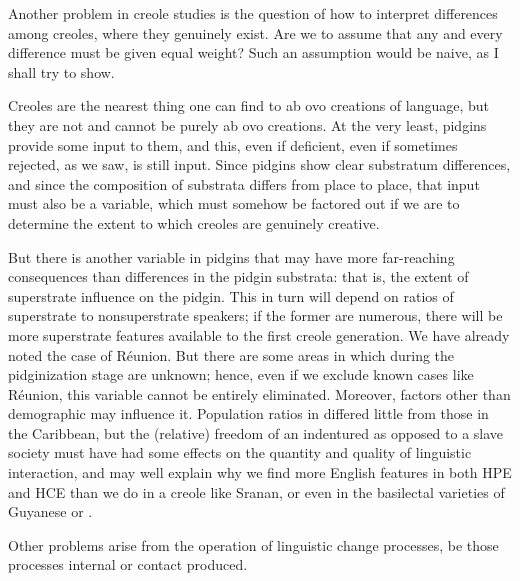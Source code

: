 Another problem in creole studies is the question of how to interpret differences among creoles, where they genuinely exist. Are we to assume that any and every difference must be given equal weight? Such an assumption would be naive, as I shall try to show.

\newpage Creoles are the nearest thing one can find to ab ovo creations of language, but they are not and cannot be purely ab ovo creations. At the very least, pidgins provide some input to them, and this, even if deficient, even if sometimes rejected, as we saw, is still input. Since pidgins show clear substratum differences, and since the composition of substrata differs from place to place, that input must also be a variable, which must somehow be factored out if we are to determine the extent to which creoles are genuinely creative.


But there is another variable in pidgins that may have more far-reaching consequences than differences in the pidgin substrata: that is, the extent of superstrate influence on the pidgin. This in turn will depend on ratios of superstrate to nonsuperstrate speakers; if the former are numerous, there will be more superstrate features avail\-able to the first creole generation. We have already noted the case of Réunion. But there are some areas in which  during the pidginization stage are unknown; hence, even if we exclude known cases like Réunion, this variable cannot be entirely eliminated. More\-over, factors other than demographic may influence it. Population ratios in  differed little from those in the Caribbean, but the (relative) freedom of an indentured as opposed to a slave society must have had some effects on the quantity and quality of linguistic inter\-action, and may well explain why we find more English features in both HPE and HCE than we do in a creole like Sranan, or even in the basilectal varieties of Guyanese or .

Other problems arise from the operation of linguistic change processes, be those processes internal or contact produced.

